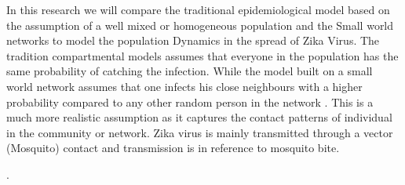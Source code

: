 In this research we will compare the traditional epidemiological model based on the  assumption of a well mixed or homogeneous population and the Small world networks to model the population Dynamics in the spread of Zika Virus. The tradition compartmental models assumes that everyone in the population has the same probability of catching the infection. While  the model built on a small world network assumes that  one infects his close neighbours with a higher probability compared to any other random person in the network \citep{newman2002random}. This is a much more realistic assumption as it captures the contact patterns of individual in the community or network. Zika virus is mainly transmitted through a vector (Mosquito) contact and transmission is in reference to mosquito bite.

.

